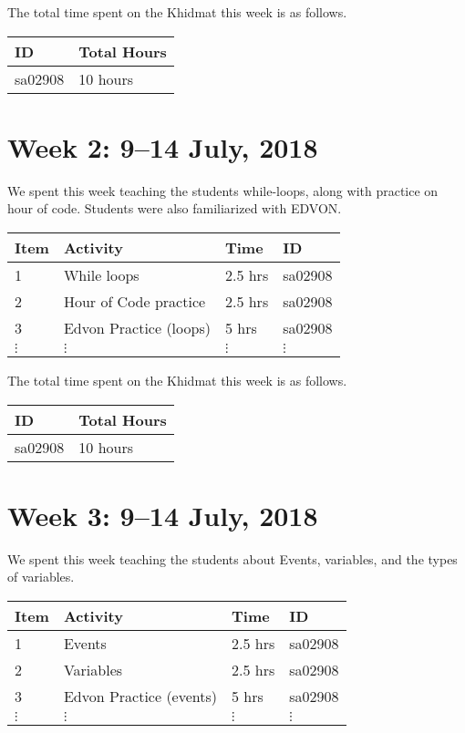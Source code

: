 \documentclass{article}
\begin{document}
The total time spent on the Khidmat this week is as follows.

\begin{tabular}{|l|l|}
  \hline
  ID & Total Hours\\\hline\hline
  sa02908 & 10 hours\\\hline
\end{tabular}


\newpage %
\section*{Week 2: 9--14 July, 2018}

We spent this week teaching the students while-loops, along with practice on hour of code. Students were also familiarized with EDVON.

\begin{tabular}{|l|l|l|l|}
  \hline
  Item  & Activity & Time & ID \\\hline\hline
  1 & While loops & 2.5 hrs & sa02908 \\\hline
  2 & Hour of Code practice & 2.5 hrs & sa02908 \\\hline
  3 & Edvon Practice (loops) & 5 hrs & sa02908 \\\hline
  $\vdots$ & $\vdots$ & $\vdots$ & $\vdots$ \\\hline
\end{tabular}

The total time spent on the Khidmat this week is as follows.

\begin{tabular}{|l|l|}
  \hline
  ID & Total Hours\\\hline\hline
  sa02908 & 10 hours\\\hline
\end{tabular}


\newpage %
\section*{Week 3: 9--14 July, 2018}

We spent this week teaching the students about Events, variables, and the types of variables.

\begin{tabular}{|l|l|l|l|}
  \hline
  Item  & Activity & Time & ID \\\hline\hline
  1 & Events & 2.5 hrs & sa02908 \\\hline
  2 & Variables & 2.5 hrs & sa02908 \\\hline
  3 & Edvon Practice (events) & 5 hrs & sa02908 \\\hline
  $\vdots$ & $\vdots$ & $\vdots$ & $\vdots$ \\\hline
\end{tabular}
\end{document}
